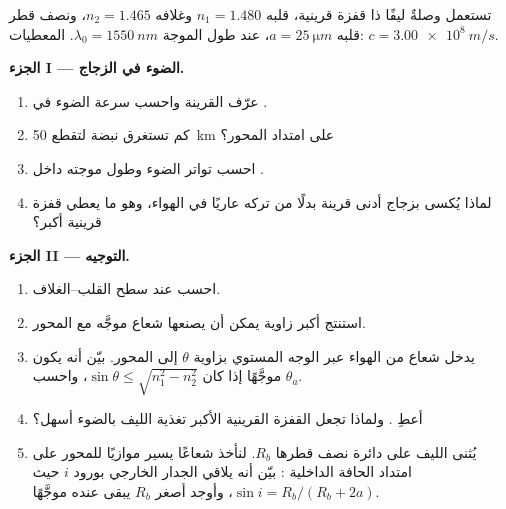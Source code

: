 \begin{problem}
\label{pb:b1:rays-reflection-refraction:1}
تستعمل وصلةٌ ليفًا ذا قفزة قرينية، قلبه $n_1 = 1.480$ وغلافه
$n_2 = 1.465$، ونصف قطر قلبه $a = \qty{25}{\micro m}$، عند طول الموجة
$\lambda_0 = \qty{1550}{nm}$. المعطيات: $c = \qty{3.00e8}{m/s}$.

\medskip
\noindent\textbf{الجزء I --- الضوء في الزجاج.}
\begin{enumerate}
  \item عرّف القرينة واحسب سرعة الضوء في .
  \item كم تستغرق نبضة لتقطع \qty{50}{km} على امتداد
        المحور؟
  \item احسب تواتر الضوء وطول موجته داخل
        .
  \item لماذا يُكسى  بزجاج أدنى قرينة بدلًا من تركه
        عاريًا في الهواء، وهو ما يعطي قفزة قرينية أكبر؟
\end{enumerate}

\medskip
\noindent\textbf{الجزء II --- التوجيه.}
\begin{enumerate}[resume]
  \item احسب  عند سطح القلب--الغلاف.
  \item استنتج أكبر زاوية يمكن أن يصنعها شعاع موجَّه مع المحور.
  \item يدخل شعاع من الهواء عبر الوجه المستوي بزاوية $\theta$ إلى
        المحور. بيّن أنه يكون موجَّهًا إذا كان $\sin\theta \leq
        \sqrt{n_1^2 - n_2^2}$، واحسب 
        $\theta_a$.
  \item أعطِ . ولماذا تجعل القفزة القرينية الأكبر
        تغذية الليف بالضوء أسهل؟
  \item يُثنى الليف على دائرة نصف قطرها $R_b$. لنأخذ
        شعاعًا يسير موازيًا للمحور على امتداد الحافة الداخلية
        : بيّن أنه يلاقي الجدار الخارجي بورود $i$ حيث
        $\sin i = R_b/(R_b + 2a)$، وأوجد أصغر $R_b$ يبقى عنده
        موجَّهًا.
\end{enumerate}


\end{problem}
